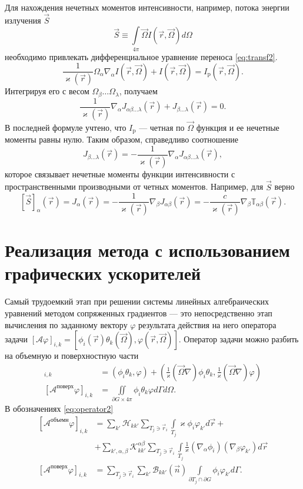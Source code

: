 Для нахождения нечетных моментов интенсивности, например, потока энергии излучения $\vec S$
\[
\vec S \equiv \int\limits_{4\pi} \vec \Omega I(\vec r, \vec \Omega) d\Omega
\]
необходимо привлекать дифференциальное уравнение переноса \eqref{eq:transf2}.
\[
\frac{1}{\varkappa(\vec r)} \Omega_\alpha \nabla_\alpha I(\vec r, \vec \Omega) + I(\vec r, \vec \Omega) = I_\text{p}(\vec r, \vec \Omega).
\]
Интегрируя его с весом $\Omega_\beta\dots\Omega_\lambda$, получаем
\[
\frac{1}{\varkappa(\vec r)} \nabla_\alpha J_{\alpha\beta\dots\lambda}(\vec r) + 
J_{\beta\dots\lambda}(\vec r) = 0.
\]
В последней формуле учтено, что $I_\text{p}$ --- четная по $\vec \Omega$ функция и ее нечетные моменты равны нулю. Таким образом, справедливо соотношение
\[
J_{\beta\dots\lambda}(\vec r) = -\frac{1}{\varkappa(\vec r)} \nabla_\alpha J_{\alpha\beta\dots\lambda}(\vec r),
\]
которое связывает нечетные моменты функции интенсивности с пространственными производными от четных моментов. Например, для $\vec S$ верно
\[
[\vec S]_\alpha(\vec r) = J_\alpha(\vec r) = -\frac{1}{\varkappa(\vec r)} \nabla_\beta J_{\alpha \beta}(\vec r) = -\frac{c}{\varkappa(\vec r)} \nabla_\beta \mathbb T_{\alpha\beta}(\vec r).
\]

\section{Реализация метода с использованием графических ускорителей}

Самый трудоемкий этап при решении системы линейных алгебраических уравнений методом сопряженных градиентов --- это непосредственно
этап вычисления по заданному вектору $\varphi$ результата действия на него оператора задачи
$[\mathcal{A}\varphi]_{i,k} = [\phi_i(\vec r)\theta_k(\vec \Omega), \varphi(\vec r, \vec \Omega)]$. Оператор задачи можно разбить на 
объемную и поверхностную части
\begin{align*}
[\mathcal{A}^\text{объемн} \varphi]_{i,k} &= \left(\phi_i\theta_k, \varphi\right) + 
\left(\frac{1}{\varkappa}(\vec \Omega \nabla)\phi_i\theta_k, \frac{1}{\varkappa}(\vec \Omega \nabla)\varphi\right)\\
[\mathcal{A}^\text{поверх} \varphi]_{i,k} &= \iint\limits_{\partial G \times 4\pi} \phi_i\theta_k \varphi d\Gamma d\Omega.
\end{align*}
В обозначениях \eqref{eq:operator2}
\begin{align*}\nonumber
[\mathcal{A}^\text{объемн} \varphi]_{i,k}  &= \sum_{k'} \mathscr{H}_{kk'}\sum_{T_j \ni \vec r_i}\int\limits_{T_j} \varkappa \phi_i \varphi_{k'} d\vec r +\\
&+\sum_{k',\alpha,\beta} \mathscr{K}_{kk'}^{\alpha\beta}
\sum_{T_j \ni \vec r_i}\int\limits_{T_j} \frac{1}{\varkappa} (\nabla_\alpha\phi_i)(\nabla_\beta\varphi_{k'}) d\vec r\\
[\mathcal{A}^\text{поверх} \varphi]_{i,k} &= \sum_{T_j \ni \vec r_i}
\sum_{k'}\mathscr{B}_{kk'}(\vec n)
\int\limits_{\partial T_j \cap \partial G} 
\phi_i \varphi_{k'} d\Gamma.
\end{align*}

